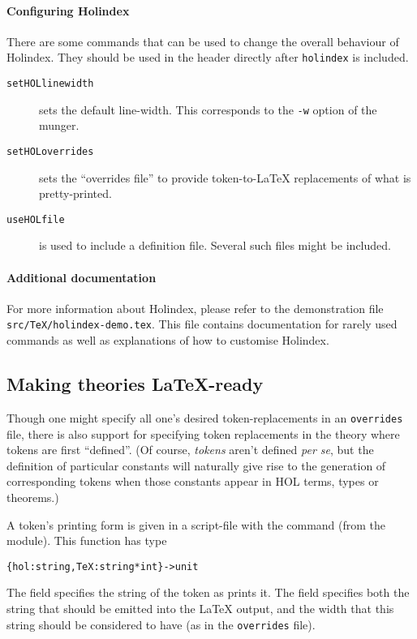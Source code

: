 \paragraph{Configuring Holindex}

There are some commands that can be used to change the overall behaviour
of Holindex. They should be used in the header directly after \texttt{holindex}
is included.
\begin{description}
\item[\texttt{\bs{}setHOLlinewidth}] sets the default line-width. This
   corresponds to the \texttt{-w} option of the munger.

\item[\texttt{\bs{}setHOLoverrides}] sets the ``overrides file'' to provide
token-to-\LaTeX{} replacements of what is pretty-printed.

\item[\texttt{\bs{}useHOLfile}]
is used to include a \HOL{} definition file. Several such files might be
included.
\end{description}


\paragraph{Additional documentation}
For more information about Holindex, please refer to
the demonstration file \texttt{src/TeX/holindex-demo.tex}. This file contains
documentation for rarely used commands as well as explanations of how to
customise Holindex.


\subsection{\texorpdfstring{Making \HOL{} theories \LaTeX{}-ready}{Making HOL theories \LaTeX{}-ready}}
\label{sec:holtheories-tex-ready}

Though one might specify all one's desired token-replacements in an \texttt{overrides} file, there is also support for specifying token replacements in the theory where tokens are first ``defined''.
%
(Of course, \emph{tokens} aren't defined \textit{per se}, but the definition of particular constants will naturally give rise to the generation of corresponding tokens when those constants appear in HOL terms, types or theorems.)

A token's printing form is given in a script-file with the  command (from the  module).
%
This function has type
\begin{alltt}
   \{ hol : string, TeX : string * int \} -> unit
\end{alltt}
The  field specifies the string of the token as \HOL{} prints it.
%
The  field specifies both the string that should be emitted into the \LaTeX{} output, and the width that this string should be considered to have (as in the \texttt{overrides} file).

